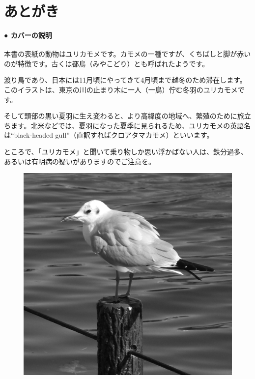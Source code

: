 \chapter*{あとがき}

\subsubsection*{● カバーの説明}

\noindent
本書の表紙の動物はユリカモメです。カモメの一種ですが、くちばしと脚が赤いのが特徴です。古くは都鳥（みやこどり）とも呼ばれたようです。

\noindent
渡り鳥であり、日本には11月頃にやってきて4月頃まで越冬のため滞在します。このイラストは、東京の川の止まり木に一人（一鳥）佇む冬羽のユリカモメです。

\noindent
そして頭部の黒い夏羽に生え変わると、より高緯度の地域へ、繁殖のために旅立ちます。北米などでは、夏羽になった夏季に見られるため、ユリカモメの英語名は``black-headed gull''（直訳すればクロアタマカモメ）といいます。

\noindent
ところで、「ユリカモメ」と聞いて乗り物しか思い浮かばない人は、鉄分過多、あるいは有明病の疑いがありますのでご注意を。

\begin{figure}[!h]
	\begin{center}
		\vspace{1cm}
		\includegraphics*[scale=0.30]{tex/e_afterword/figs/yurikamome.eps}
		\vspace{-5cm}
	\end{center}
\end{figure}


